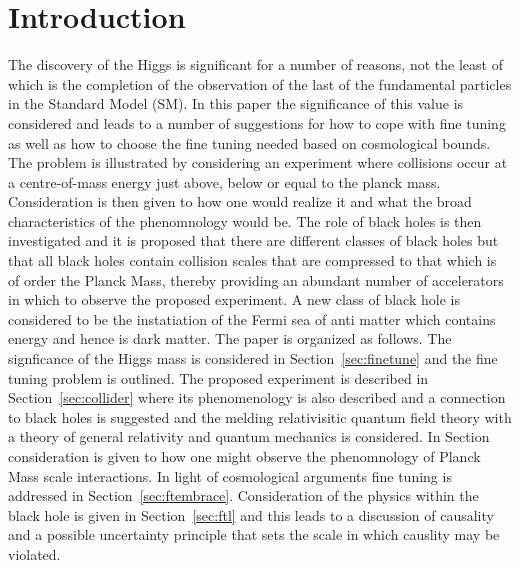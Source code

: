 \documentclass[a4paper]{article}
\begin{document}
\section{Introduction}
The discovery of the Higgs is significant for a number of reasons, not the least of which
is the completion of the observation of the last of the fundamental particles in the Standard Model (SM). 
In this paper the significance of this value is considered and leads to a number of suggestions for 
how to cope with fine tuning as well as how to choose the fine tuning needed based on cosmological bounds.
The problem is illustrated by considering an experiment where collisions occur at a centre-of-mass energy
just above, below or equal to the planck mass. Consideration is then given to how one would realize it and
what the broad characteristics of the phenomnology would be. The role of black holes is then investigated and
it is proposed that there are different classes of black holes but that all black holes contain collision
scales that are compressed to that which is of order the Planck Mass, thereby providing an abundant number
of accelerators in which to observe the proposed experiment.  A new class of black hole is considered to be 
the instatiation of the Fermi sea of anti matter which contains energy and hence is dark matter. 
The paper is organized as follows. The signficance of the Higgs mass is considered in Section~\ref{sec:finetune}
and the fine tuning problem is outlined. The proposed experiment is described in Section~\ref{sec:collider}
where its phenomenology is also described and a connection to black holes is suggested and the melding 
relativisitic quantum field theory with a theory of general relativity and quantum mechanics is considered.
In Section~\label{sec:accelerator} consideration is given to how one might observe the phenomnology of
Planck Mass scale interactions. In light of cosmological arguments fine tuning is addressed in 
Section~\ref{sec:ftembrace}.  Consideration of the physics within the black hole is given in 
Section~\ref{sec:ftl} and this leads to a discussion of causality and a possible uncertainty principle
that sets the scale in which causlity may be violated.
\end{document}
